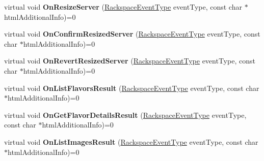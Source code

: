 \begin{DoxyCompactItemize}
\item 
\hypertarget{class_rak_net_1_1_rackspace2_event_callback_a90a700420e07534bf4e8b22e7c1302f1}{virtual void {\bfseries On\-Resize\-Server} (\hyperlink{namespace_rak_net_a120cf6e1a0904cff45269f14c3c4c289}{Rackspace\-Event\-Type} event\-Type, const char $\ast$html\-Additional\-Info)=0}\label{class_rak_net_1_1_rackspace2_event_callback_a90a700420e07534bf4e8b22e7c1302f1}

\item 
\hypertarget{class_rak_net_1_1_rackspace2_event_callback_a5d0f64bcd887379f5ee57ea06159e6b5}{virtual void {\bfseries On\-Confirm\-Resized\-Server} (\hyperlink{namespace_rak_net_a120cf6e1a0904cff45269f14c3c4c289}{Rackspace\-Event\-Type} event\-Type, const char $\ast$html\-Additional\-Info)=0}\label{class_rak_net_1_1_rackspace2_event_callback_a5d0f64bcd887379f5ee57ea06159e6b5}

\item 
\hypertarget{class_rak_net_1_1_rackspace2_event_callback_ac1e0dc637868d9c4b5aac578c8686196}{virtual void {\bfseries On\-Revert\-Resized\-Server} (\hyperlink{namespace_rak_net_a120cf6e1a0904cff45269f14c3c4c289}{Rackspace\-Event\-Type} event\-Type, const char $\ast$html\-Additional\-Info)=0}\label{class_rak_net_1_1_rackspace2_event_callback_ac1e0dc637868d9c4b5aac578c8686196}

\item 
\hypertarget{class_rak_net_1_1_rackspace2_event_callback_a54ad1816f250713038e6e3565f319cfe}{virtual void {\bfseries On\-List\-Flavors\-Result} (\hyperlink{namespace_rak_net_a120cf6e1a0904cff45269f14c3c4c289}{Rackspace\-Event\-Type} event\-Type, const char $\ast$html\-Additional\-Info)=0}\label{class_rak_net_1_1_rackspace2_event_callback_a54ad1816f250713038e6e3565f319cfe}

\item 
\hypertarget{class_rak_net_1_1_rackspace2_event_callback_ad12876146b9f16d647d0eea14e2a5e17}{virtual void {\bfseries On\-Get\-Flavor\-Details\-Result} (\hyperlink{namespace_rak_net_a120cf6e1a0904cff45269f14c3c4c289}{Rackspace\-Event\-Type} event\-Type, const char $\ast$html\-Additional\-Info)=0}\label{class_rak_net_1_1_rackspace2_event_callback_ad12876146b9f16d647d0eea14e2a5e17}

\item 
\hypertarget{class_rak_net_1_1_rackspace2_event_callback_aeebd6110536469b3ddde17abddd8657e}{virtual void {\bfseries On\-List\-Images\-Result} (\hyperlink{namespace_rak_net_a120cf6e1a0904cff45269f14c3c4c289}{Rackspace\-Event\-Type} event\-Type, const char $\ast$html\-Additional\-Info)=0}\label{class_rak_net_1_1_rackspace2_event_callback_aeebd6110536469b3ddde17abddd8657e}


\end{DoxyCompactItemize}
